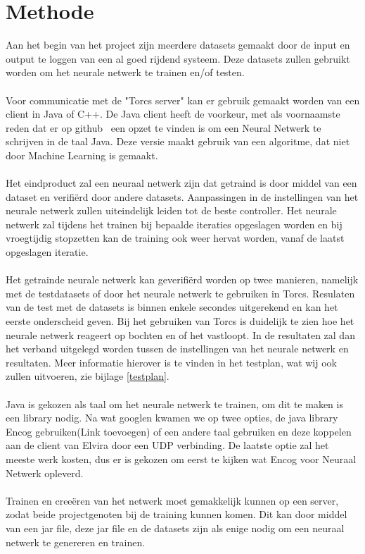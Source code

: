 \documentclass{article}
\begin{document}
\pagebreak
\pagebreak

\pagebreak
\section{Methode}
Aan het begin van het project zijn meerdere datasets gemaakt door de input en output te loggen van een al goed rijdend systeem. Deze datasets zullen gebruikt worden om het neurale netwerk te trainen en/of testen.\\\\ 
Voor communicatie met de "Torcs server" kan er gebruik gemaakt worden van een client in Java of C++. De Java client heeft de voorkeur, met als voornaamste reden dat er op github~\cite{java-client} een opzet te vinden is om een Neural Netwerk te schrijven in de taal Java. Deze versie maakt gebruik van een algoritme, dat niet door Machine Learning is gemaakt. \\\\
Het eindproduct zal een neuraal netwerk zijn dat getraind is door middel van een dataset en verifi\"erd door andere datasets. Aanpassingen in de instellingen van het neurale netwerk zullen uiteindelijk leiden tot de beste controller. Het neurale netwerk zal tijdens het trainen bij bepaalde iteraties opgeslagen worden en bij vroegtijdig stopzetten kan de training ook weer hervat worden, vanaf de laatst opgeslagen iteratie. \\\\
Het getrainde neurale netwerk kan geverifi\"erd worden op twee manieren, namelijk met de testdatasets of door het neurale netwerk te gebruiken in Torcs. Resulaten van de test met de datasets is binnen enkele secondes uitgerekend en kan het eerste onderscheid geven. Bij het gebruiken van Torcs is duidelijk te zien hoe het neurale netwerk reageert op bochten en of het vastloopt. In de resultaten zal dan het verband uitgelegd worden tussen de instellingen van het neurale netwerk en resultaten. Meer informatie hierover is te vinden in het testplan, wat wij ook zullen uitvoeren, zie bijlage \ref{testplan}. \\\\
Java is gekozen als taal om het neurale netwerk te trainen, om dit te maken is een library nodig. Na wat googlen kwamen we op twee opties, de java library Encog gebruiken(Link toevoegen) of een andere taal gebruiken en deze koppelen aan de client van Elvira door een UDP verbinding. De laatste optie zal het meeste werk kosten, dus er is gekozen om eerst te kijken wat Encog voor Neuraal Netwerk opleverd. 
\\\\
Trainen en cree\"eren van het netwerk moet gemakkelijk kunnen op een server, zodat beide projectgenoten bij de training kunnen komen. Dit kan door middel van een jar file, deze jar file en de datasets zijn als enige nodig om een neuraal netwerk te genereren en trainen.
\pagebreak
\end{document}
